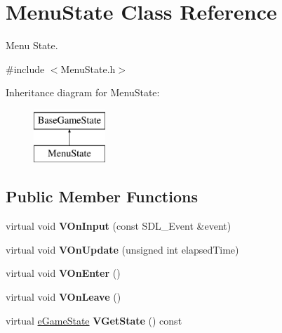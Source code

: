 \hypertarget{classMenuState}{\section{Menu\-State Class Reference}
\label{classMenuState}
}


Menu State.  




{\ttfamily \#include $<$Menu\-State.\-h$>$}

Inheritance diagram for Menu\-State\-:\begin{figure}[H]
\begin{center}
\leavevmode
\includegraphics[height=2.000000cm]{classMenuState}
\end{center}
\end{figure}
\subsection*{Public Member Functions}
\begin{DoxyCompactItemize}
\item 
\hypertarget{classMenuState_a2260600c93510f160baaa7dd54503033}{virtual void {\bfseries V\-On\-Input} (const S\-D\-L\-\_\-\-Event \&event)}\label{classMenuState_a2260600c93510f160baaa7dd54503033}

\item 
\hypertarget{classMenuState_a08f6e501530c35063e8883a664b48abb}{virtual void {\bfseries V\-On\-Update} (unsigned int elapsed\-Time)}\label{classMenuState_a08f6e501530c35063e8883a664b48abb}

\item 
\hypertarget{classMenuState_a31f49a285d0ef93c776aa591defcd840}{virtual void {\bfseries V\-On\-Enter} ()}\label{classMenuState_a31f49a285d0ef93c776aa591defcd840}

\item 
\hypertarget{classMenuState_a11c2c8f0f8632bd9b9f3957874a1587f}{virtual void {\bfseries V\-On\-Leave} ()}\label{classMenuState_a11c2c8f0f8632bd9b9f3957874a1587f}

\item 
\hypertarget{classMenuState_a96ac0cc1ea1be0daaf665ae76242dad8}{virtual \hyperlink{BaseGameState_8h_ae12dcfc1b1e01980b11e116e3af6807f}{e\-Game\-State} {\bfseries V\-Get\-State} () const }\label{classMenuState_a96ac0cc1ea1be0daaf665ae76242dad8}

\end{DoxyCompactItemize}
